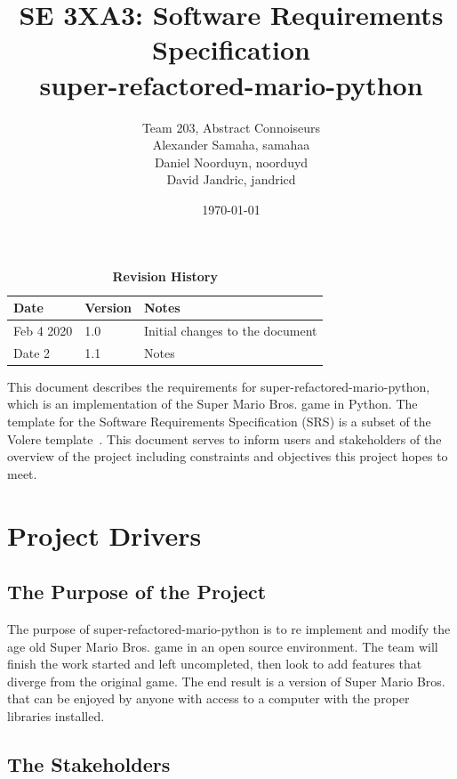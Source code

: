 \documentclass[12pt, titlepage]{article}
\title{SE 3XA3: Software Requirements Specification\\super-refactored-mario-python}
\author{Team 203, Abstract Connoiseurs
		\\ Alexander Samaha, samahaa
		\\ Daniel Noorduyn, noorduyd
		\\ David Jandric, jandricd
}
\date{\today}
\begin{document}
\maketitle

\tableofcontents
\listoftables
\listoffigures

\begin{table}[bp]
\caption{\bf Revision History}
\begin{tabularx}{\textwidth}{p{3cm}p{2cm}X}
\toprule {\bf Date} & {\bf Version} & {\bf Notes}\\
\midrule
Feb 4 2020 & 1.0 & Initial changes to the document \\
Date 2 & 1.1 & Notes\\
\bottomrule
\end{tabularx}
\end{table}

\newpage


This document describes the requirements for super-refactored-mario-python, which is an implementation of the Super Mario Bros. game in Python. The template for the Software
Requirements Specification (SRS) is a subset of the Volere
template~\citep{RobertsonAndRobertson2012}. This document serves to inform users and stakeholders of the overview of the project including constraints and objectives this project hopes to meet.

\section{Project Drivers}

\subsection{The Purpose of the Project}
    The purpose of super-refactored-mario-python is to re implement and modify the age old Super Mario Bros. game in an open source environment. The team will finish the work started and left uncompleted, then look to add features that diverge from the original game. The end result is a version of Super Mario Bros. that can be enjoyed by anyone with access to a computer with the proper libraries installed.
    
\subsection{The Stakeholders}
\end{document}
